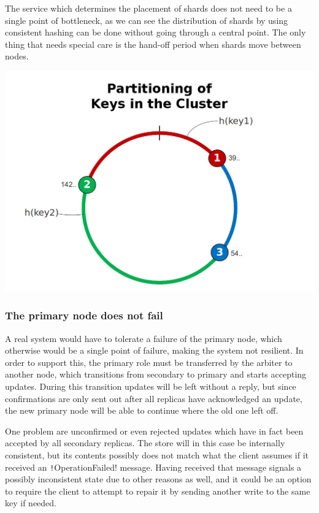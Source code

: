 \documentclass{article}
\begin{document}
The service which determines the placement of shards does not need to be a single point of bottleneck,  as we can see the distribution of shards by using consistent hashing  can be done without going through a central point. The only thing that  needs special care is the hand-off period when shards move between  nodes.
\begin{center}\includegraphics[scale=0.4]{partitioningofkeysinthecluster.png}
\end{center}	


\subsubsection{The primary node does not fail}

A real system would have to tolerate a failure of the primary node,  which otherwise would be a single point of failure, making the system  not resilient. In order to support this, the primary role must be  transferred by the arbiter to another node, which transitions from  secondary to primary and starts accepting updates. During this transition  updates will be left without a reply, but since confirmations are only  sent out after all replicas have acknowledged an update, the new primary  node will be able to continue where the old one left off.

One problem are unconfirmed or even rejected updates which have in  fact been accepted by all secondary replicas. The store will in this  case be internally consistent, but its contents possibly does not match  what the client assumes if it received an \texttt!OperationFailed!  message. Having received that message signals a possibly inconsistent  state due to other reasons as well, and it could be an option to require  the client to attempt to repair it by sending another write to the same  key if needed.
\end{document}
